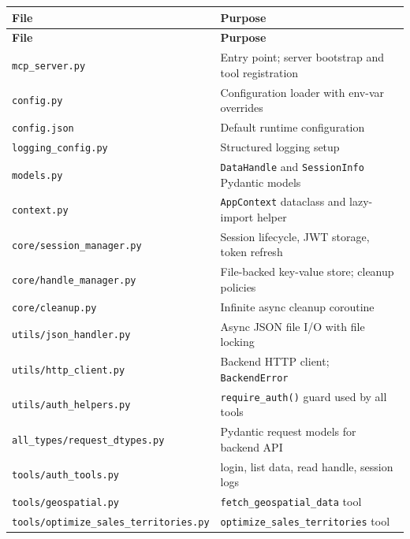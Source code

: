 \documentclass[12pt,a4paper]{report}
\begin{document}
\begin{center}
\begin{longtable}{lp{9cm}}
  \toprule
  \textbf{File} & \textbf{Purpose} \\
  \midrule
  \endfirsthead
  \toprule
  \textbf{File} & \textbf{Purpose} \\
  \midrule
  \endhead
  \texttt{mcp\_server.py}                              & Entry point; server bootstrap and tool registration \\
  \texttt{config.py}                                   & Configuration loader with env-var overrides \\
  \texttt{config.json}                                 & Default runtime configuration \\
  \texttt{logging\_config.py}                          & Structured logging setup \\
  \texttt{models.py}                                   & \texttt{DataHandle} and \texttt{SessionInfo} Pydantic models \\
  \texttt{context.py}                                  & \texttt{AppContext} dataclass and lazy-import helper \\
  \texttt{core/session\_manager.py}                    & Session lifecycle, JWT storage, token refresh \\
  \texttt{core/handle\_manager.py}                     & File-backed key-value store; cleanup policies \\
  \texttt{core/cleanup.py}                             & Infinite async cleanup coroutine \\
  \texttt{utils/json\_handler.py}                      & Async JSON file I/O with file locking \\
  \texttt{utils/http\_client.py}                       & Backend HTTP client; \texttt{BackendError} \\
  \texttt{utils/auth\_helpers.py}                      & \texttt{require\_auth()} guard used by all tools \\
  \texttt{all\_types/request\_dtypes.py}               & Pydantic request models for backend API \\
  \texttt{tools/auth\_tools.py}                        & login, list data, read handle, session logs \\
  \texttt{tools/geospatial.py}                         & \texttt{fetch\_geospatial\_data} tool \\
  \texttt{tools/optimize\_sales\_territories.py}       & \texttt{optimize\_sales\_territories} tool \\

\end{longtable}
\end{center}
\end{document}
